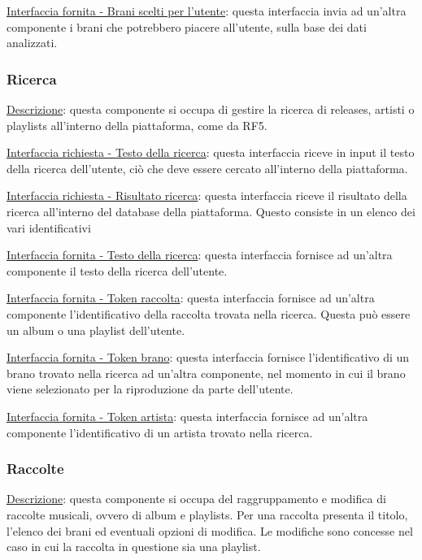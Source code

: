 \documentclass[a4paper,12pt]{article}
\begin{document}
\underline{Interfaccia fornita - Brani scelti per l’utente}: questa interfaccia invia ad un’altra componente i brani che potrebbero piacere all’utente, sulla base dei dati analizzati.

\subsubsection{Ricerca}

\underline{Descrizione}: questa componente si occupa di gestire la ricerca di releases, artisti o playlists all’interno della piattaforma, come da RF5.

\underline{Interfaccia richiesta - Testo della ricerca}: questa interfaccia riceve in input il testo della ricerca dell’utente, ciò che deve essere cercato all’interno della piattaforma.

\underline{Interfaccia richiesta - Risultato ricerca}: questa interfaccia riceve il risultato della ricerca all’interno del database della piattaforma. Questo consiste in un elenco dei vari identificativi

\underline{Interfaccia fornita - Testo della ricerca}: questa interfaccia fornisce ad un’altra componente il testo della ricerca dell’utente.

\underline{Interfaccia fornita - Token raccolta}: questa interfaccia fornisce ad un’altra componente l’identificativo della raccolta trovata nella ricerca. Questa può essere un album o una playlist dell’utente.

\underline{Interfaccia fornita - Token brano}: questa interfaccia fornisce l’identificativo di un brano trovato nella ricerca ad un’altra componente, nel momento in cui il brano viene selezionato per la riproduzione da parte dell’utente.

\underline{Interfaccia fornita - Token artista}: questa interfaccia fornisce ad un’altra componente l’identificativo di un artista trovato nella ricerca.

\subsubsection{Raccolte}

\underline{Descrizione}: questa componente si occupa del raggruppamento e modifica di raccolte musicali, ovvero di album e playlists. Per una raccolta presenta il titolo, l’elenco dei brani ed eventuali opzioni di modifica. Le modifiche sono concesse nel caso in cui la raccolta in questione sia una playlist.
\end{document}
